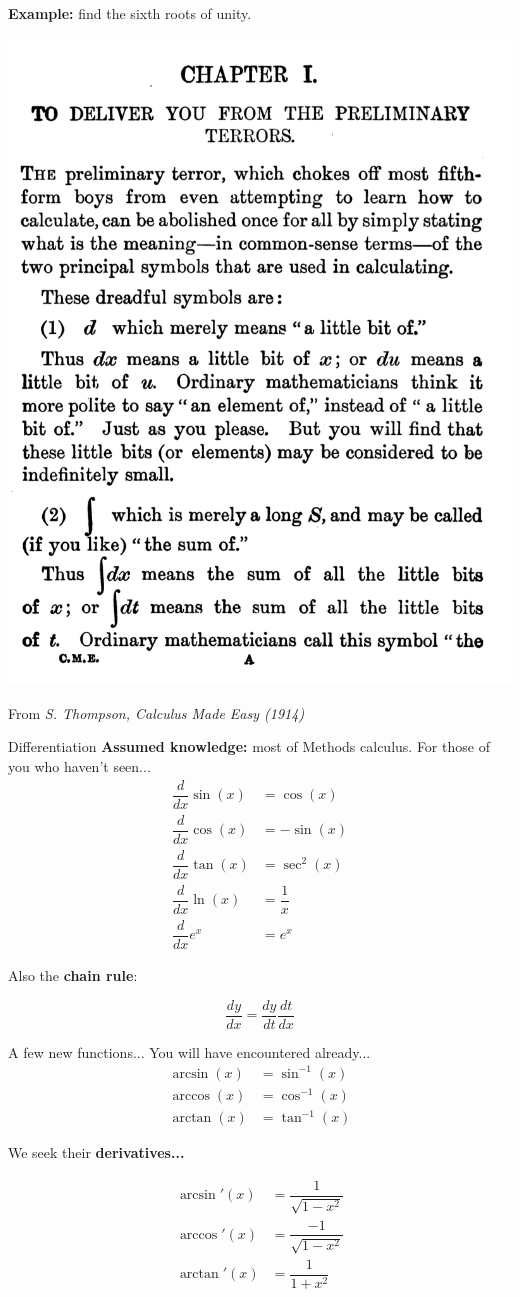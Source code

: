 \documentclass{beamer}
\begin{document}
\begin{frame}
	\textbf{Example:} find the sixth roots of unity.
	\vspace{5cm}
\end{frame}

\begin{frame}
	\begin{center}
	\includegraphics[width=0.5\linewidth]{img/quote2.png}
	\end{center}
	From \textit{S. Thompson, Calculus Made Easy (1914)}
\end{frame}

\begin{frame}{Differentiation}
	\textbf{Assumed knowledge: } most of Methods calculus. For those of you who haven't seen...
	\begin{align*}
		\dfrac{d}{dx} \sin(x) &= \cos(x)\\
		\dfrac{d}{dx} \cos(x) &= -\sin(x)\\
		\dfrac{d}{dx} \tan(x) &= \sec^2(x)\\
		\dfrac{d}{dx} \ln(x) &= \dfrac{1}{x}\\
		\dfrac{d}{dx} e^x &= e^x
	\end{align*}
	
	Also the \textbf{chain rule}:
	
	$$\dfrac{dy}{dx} = \dfrac{dy}{dt} \dfrac{dt}{dx}$$
	
\end{frame}

\begin{frame}{A few new functions...}
	You will have encountered already...
	\begin{align*}
		\arcsin(x) &= \sin^{-1}(x)\\
		\arccos(x) &= \cos^{-1}(x)\\
		\arctan(x) &= \tan^{-1}(x)
	\end{align*}

We seek their \textbf{derivatives...}

\begin{align*}
	\arcsin'(x) &= \dfrac{1}{\sqrt{1-x^2}}\\
	\arccos'(x) &= \dfrac{-1}{\sqrt{1-x^2}}\\
	\arctan'(x) &= \dfrac{1}{1+x^2}
\end{align*}
\end{frame}
\end{document}

